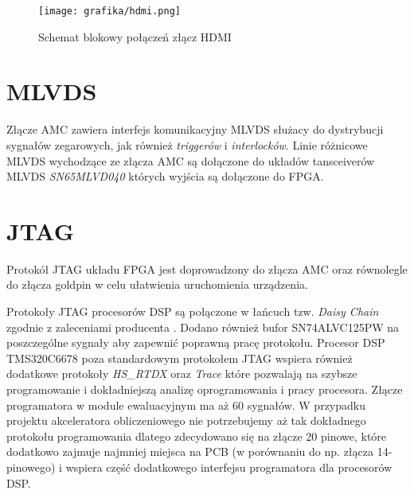 \begin{figure}[!ht]
\centering
\texttt{[image: grafika/hdmi.png]}
\caption{Schemat blokowy połączeń złącz HDMI}
\end{figure}



%
%
%
%
%
%
%
%
\section{MLVDS}
Złącze AMC zawiera interfejs komunikacyjny MLVDS służacy do dystrybucji sygnałów zegarowych, jak również \textit{triggerów} i \textit{interlocków}. Linie różnicowe MLVDS wychodzące ze złącza AMC są dołączone do układów tansceiverów MLVDS \textit{SN65MLVD040} \cite{SN65MLVD040} których wyjścia są dołączone do FPGA. 
\section{JTAG}
Protokół JTAG układu FPGA jest doprowadzony do złącza AMC oraz równolegle do złącza goldpin w celu ułatwienia uruchomienia urządzenia. 

Protokoły JTAG procesorów DSP są połączone w łańcuch tzw. \textit{Daisy Chain} zgodnie z zaleceniami producenta \cite{DSP:HDG} \cite{WIKI:TI_XDS}. Dodano również bufor SN74ALVC125PW \cite{SN74ALVC125} na poszczególne sygnały aby zapewnić poprawną pracę protokołu. Procesor DSP TMS320C6678 poza standardowym protokołem JTAG wspiera również dodatkowe protokoły \textit{HS\_RTDX} oraz \textit{Trace} które pozwalają na szybsze programowanie i dokładniejszą analizę oprogramowania i pracy procesora. Złącze programatora w module ewaluacyjnym ma aż 60 sygnałów. W przypadku projektu akceleratora obliczeniowego nie potrzebujemy aż tak dokładnego protokołu programowania dlatego zdecydowano się na złącze 20 pinowe, które dodatkowo zajmuje najmniej miejsca na PCB (w porównaniu do np. złącza 14-pinowego) i wspiera część dodatkowego interfejsu programatora dla procesorów DSP. 

